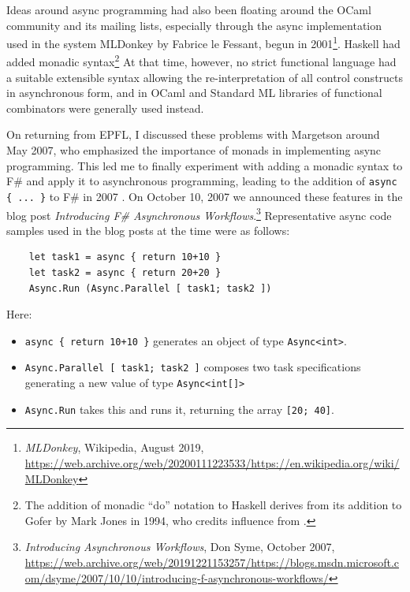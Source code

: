 \documentclass[acmsmall]{acmart}\settopmatter{}
\begin{document}
Ideas around async programming had also been floating around the OCaml community and its mailing lists, especially through the async implementation used in the system MLDonkey by Fabrice le Fessant, begun in 2001\footnote{\textit{MLDonkey}, Wikipedia, August 2019, \url{https://web.archive.org/web/20200111223533/https://en.wikipedia.org/wiki/MLDonkey}}.  Haskell had added monadic syntax\footnote{The addition of  monadic “do” notation to Haskell derives from its addition to Gofer by Mark Jones in 1994, who credits influence from \citep{Launchbury93lazy}.} At that time, however,
no strict functional language had a suitable extensible syntax allowing the re-interpretation of all control constructs in asynchronous form, and in
OCaml and Standard ML libraries of functional combinators were generally used instead.  

On returning from EPFL, I discussed these problems with Margetson around May 2007, who emphasized the importance of monads in implementing async programming. This led me to finally experiment with adding a monadic syntax to F\# and apply it to asynchronous programming, leading to the addition of \texttt{async \{ ... \}} to F\# in 2007 \citep{Syme2011}.  On October 10, 2007 we announced these features in the blog post \textit{Introducing F\# Asynchronous Workflows}.\footnote{\textit{Introducing Asynchronous Workflows}, Don Syme, October 2007, \url{https://web.archive.org/web/20191221153257/https://blogs.msdn.microsoft.com/dsyme/2007/10/10/introducing-f-asynchronous-workflows/}}  Representative async code samples used in the blog posts at the time were as follows:

\begin{verbatim}
    let task1 = async { return 10+10 }
    let task2 = async { return 20+20 }
    Async.Run (Async.Parallel [ task1; task2 ])
\end{verbatim}

Here:
\begin{itemize}
\item \texttt{async \{ return 10+10 \}} generates an object of type \texttt{Async<int>}.  
\item \texttt{Async.Parallel [ task1; task2 ]} composes two task specifications generating a new value of type \texttt{Async<int[]>}
\item \texttt{Async.Run} takes this and runs it, returning the array \texttt{[20; 40]}. 
\end{itemize}
\end{document}
